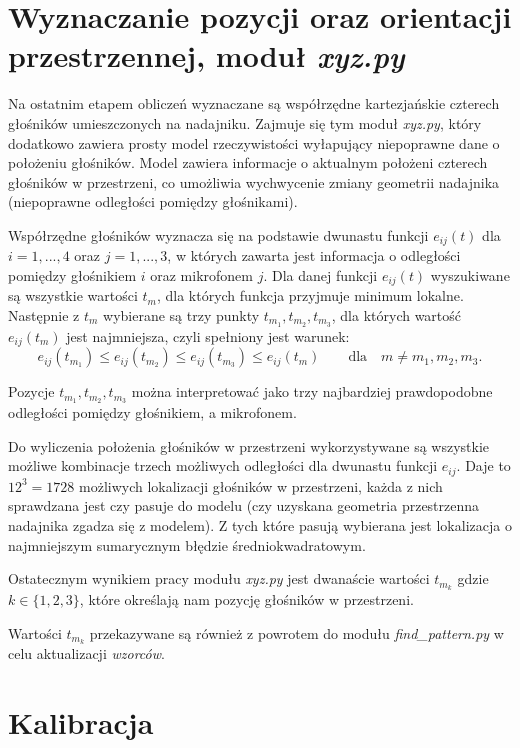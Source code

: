  
\section{Wyznaczanie pozycji oraz orientacji przestrzennej, moduł \textit{xyz.py}}

Na ostatnim etapem obliczeń wyznaczane są współrzędne kartezjańskie czterech głośników umieszczonych na nadajniku.
Zajmuje się tym moduł \textit{xyz.py}, który dodatkowo zawiera prosty model rzeczywistości
wyłapujący niepoprawne dane o położeniu głośników.
Model zawiera informacje o aktualnym położeni czterech głośników w przestrzeni, co umożliwia wychwycenie 
zmiany geometrii nadajnika (niepoprawne odległości pomiędzy głośnikami).

Współrzędne głośników wyznacza się na podstawie dwunastu funkcji $e_{ij}(t)$ dla $i=1, ..., 4$ oraz $j=1, ..., 3$,
w których zawarta jest informacja o odległości pomiędzy głośnikiem $i$ oraz mikrofonem $j$.
Dla danej funkcji $e_{ij}(t)$ wyszukiwane są wszystkie wartości $t_m$, dla których funkcja przyjmuje minimum lokalne.
Następnie z $t_m$ wybierane są trzy punkty $t_{m_1}, t_{m_2}, t_{m_3}$, dla których wartość $e_{ij}(t_m)$ jest najmniejsza,
czyli spełniony jest  warunek:
\[ e_{ij}(t_{m_1}) \leq e_{ij}(t_{m_2}) \leq e_{ij}(t_{m_3}) \leq e_{ij}(t_m) \qquad \text{dla} \quad m \ne m_1,m_2,m_3. \]

Pozycje $t_{m_1}, t_{m_2}, t_{m_3}$  można interpretować jako trzy najbardziej prawdopodobne odległości 
pomiędzy głośnikiem, a mikrofonem.

Do wyliczenia położenia głośników w przestrzeni wykorzystywane są wszystkie możliwe kombinacje 
trzech możliwych odległości dla dwunastu funkcji $e_{ij}$.
Daje to $12^3 = 1728$ możliwych lokalizacji głośników w przestrzeni, 
każda z nich sprawdzana jest czy pasuje do modelu (czy uzyskana geometria przestrzenna nadajnika zgadza się z
modelem). Z tych które pasują wybierana jest lokalizacja o najmniejszym sumarycznym błędzie średniokwadratowym.

Ostatecznym wynikiem pracy modułu \textit{xyz.py} jest dwanaście wartości $t_{m_k}$ gdzie $k\in \{1,2,3\}$, 
które określają nam pozycję głośników w przestrzeni.

Wartości $t_{m_k}$ przekazywane są również z powrotem do modułu \textit{find\_pattern.py} w celu aktualizacji \textit{wzorców}.


\section{Kalibracja}

